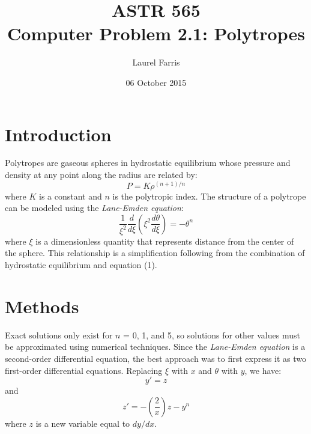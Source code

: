 \documentclass[12pt]{article}
\title{ASTR 565 \\
Computer Problem 2.1: Polytropes}
\author{Laurel Farris}
\date{06 October 2015}
\begin{document}
\maketitle
\section{Introduction}
Polytropes are gaseous spheres in hydrostatic equilibrium whose
pressure and density at any point along the radius are related by:
\begin{equation}
P = K\rho^{(n+1)/n}
\end{equation}
where $K$ is a constant and $n$ is the polytropic index.
The structure of a polytrope can be modeled using the \emph{Lane-Emden
equation}:
\begin{equation}
  \frac{1}{\xi^2}\frac{d}{d\xi}\left(\xi^2\frac{d\theta}{d\xi}\right) =
  -{\theta^n}
\end{equation}
where $\xi$ is a dimensionless quantity that represents distance from
the center of the sphere. This
relationship is a simplification following from the combination of hydrostatic
equilibrium and equation (1). \cite{clayton}

\section{Methods}
Exact solutions only exist for $n$
= 0, 1, and 5, so solutions for other values must be approximated
using numerical techniques. Since the \emph{Lane-Emden
equation} is a second-order differential equation, the best approach
was to first express it as two first-order differential equations. Replacing
$\xi$ with $x$ and $\theta$ with $y$, we have: 
\begin{equation}
 y' = z
\end{equation}
and
\begin{equation}
 z' = -\left(\frac{2}{x}\right)z -y^n
\end{equation}
where $z$ is a new variable equal to $dy/dx$.
\end{document}
